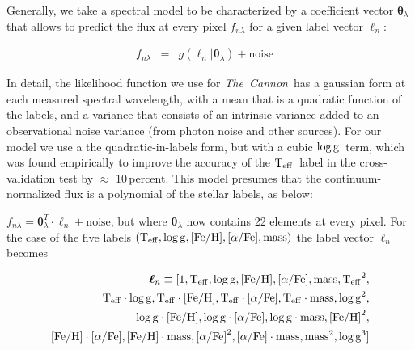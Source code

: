 \documentclass[12pt, preprint]{aastex}
\newcommand{\project}[1]{\textsl{#1}}
\newcommand{\tc}{\project{The~Cannon}}
\newcommand{\teff}{\mbox{$\rm T_{eff}$}}
\newcommand{\feh}{\mbox{$\rm [Fe/H]$}}
\newcommand{\alphafe}{\mbox{$\rm [\alpha/Fe]$}}
\newcommand{\logg}{\mbox{$\rm \log g$}}
\newcommand{\set}[1]{\bm{#1}}
\newcommand{\starlabel}{\ell}
\newcommand{\starlabelvec}{\set{\starlabel}}
\begin{document}
Generally, we take a spectral model to be characterized by a coefficient vector $\set{\theta}_\lambda$
that allows to predict the flux at every pixel $f_{n\lambda}$ for a given label vector $\starlabelvec_n$:


\begin{eqnarray}
f_{n\lambda} &=&
g(\starlabelvec_n |  \set{\theta}_\lambda) + \mbox{noise}
\label{eq:specmodel}\quad 
\end{eqnarray}

In detail, the likelihood function we use for \tc\ has a
gaussian form at each measured spectral wavelength, with a mean that
is a quadratic function of the labels, and a variance that consists of
an intrinsic variance added to an observational noise variance (from
photon noise and other sources). For our model we use a the quadratic-in-labels form, but with a cubic \logg\ term, which was found empirically to improve the accuracy of the \teff\ label in the cross-validation test by $\approx$ 10\,percent.  This model presumes that the continuum-normalized flux is a polynomial of the stellar labels, as below: 

$f_{n\lambda} =
\set{\theta}_\lambda^T \cdot \starlabelvec_n + \mbox{noise}$, 
but where $\set{\theta}_\lambda$ now contains 22 elements at every pixel. For the case of the five labels $(\teff , \logg , \feh, \alphafe, \mbox{mass})$ the label vector $\starlabelvec_n$
becomes  

\begin{equation}
\begin{split}
\starlabelvec_n \equiv  [1, \teff, \logg, \feh, \alphafe, \mbox{mass}, \teff^2, \\
 \teff\cdot\logg, \teff\cdot\feh, \teff\cdot\alphafe, \teff\cdot \mbox{mass},  \logg^2, \\
  \logg\cdot\feh, \logg\cdot\alphafe, \logg\cdot \mbox{mass}, \feh^2, \\
  \feh\cdot\alphafe, \feh\cdot \mbox{mass}, \alphafe^2, \alphafe\cdot \mbox{mass}, \mbox{mass}^2,  \logg^3]
\end{split}
 \label{eq:quad}
\end{equation}


\end{document}
